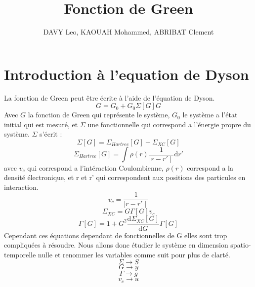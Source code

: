 \documentclass[12pt]{article}
\title{Fonction de Green}
\author{DAVY Leo, KAOUAH Mohammed, ABRIBAT Clement}
\begin{document}
\maketitle
\section{Introduction à l'equation de Dyson}
La fonction de Green peut \^etre \'ecrite \`a l'aide de l'\'equation de Dyson. 
\begin{equation}
	G = G_0 + G_0 \Sigma[G] G
\end{equation}
Avec $G$ la fonction de Green qui repr\'esente le syst\`eme, $G_0$ le syst\`eme a l'\'etat initial qui est mesur\'e, et $\Sigma$ une fonctionnelle qui correspond a l'\'energie propre du syst\`eme.
$\Sigma$ s'\'ecrit :
\begin{equation}
	\Sigma[G] = \Sigma_{Hartree}[G] + \Sigma_{XC}[G]
\end{equation}
\begin{equation}
	\Sigma_{Hartree}[G] = \int \rho(r) \frac{1}{\mid r - r'\mid }\mathrm{d}r' 
\end{equation}
avec $v_c$ qui correspond a l'int\'eraction Coulombienne, $\rho(r)$ correspond a la densit\'e \'electronique, et r et r' qui correspondent aux positions des particules en interaction.
\begin{equation}
	v_c =  \frac{1}{\mid r - r'\mid }
\end{equation}
\begin{equation}
	\Sigma_{XC} = G \Gamma[G] v_c
\end{equation}
\begin{equation}
	\Gamma[G] = 1 + G^2 \frac{\mathrm{d} \Sigma_{XC}[G]}{\mathrm{d}G} \Gamma[G]
\end{equation}
Cependant ces \'equations dependant de fonctionnelles de G elles sont trop compliqu\'ees \`a r\'esoudre. Nous allons donc \'etudier le syst\`eme en dimension spatio-temporelle nulle et renommer les variables comme suit pour plus de clart\'e.
\begin{equation}
	\Sigma \longrightarrow S
\end{equation}
\begin{equation}
	G \longrightarrow y
\end{equation}
\begin{equation}
	\Gamma \longrightarrow g
\end{equation}
\begin{equation}
	v_c \longrightarrow u
\end{equation}
\end{document}
